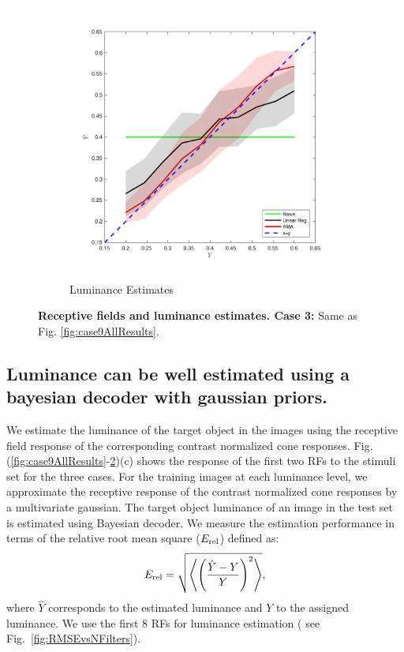 \documentclass{jov}
\begin{document}
\begin{figure}
\begin{subfigure}[b]{0.2 \textwidth}
        \includegraphics[width=\textwidth]{../Figures/Figure12/Figure12_c.pdf}
        \caption{Luminance Estimates}
        \label{fig:case12Results}
    \end{subfigure}
    \caption{{\bf Receptive fields and luminance estimates. Case 3:}  Same as Fig. \ref{fig:case9AllResults}.}
    \label{fig:case12AllResults}
\end{figure}

\subsection{Luminance can be well estimated using a bayesian decoder with gaussian priors.}
We estimate the luminance of the target object in the images using the receptive field response of the corresponding contrast normalized cone responses. Fig.~ (\ref{fig:case9AllResults}-\ref{fig:case12AllResults})(c) shows the response of the first two RFs to the stimuli set for the three cases. For the training images at each luminance level, we approximate the receptive response of the contrast normalized cone responses by a multivariate gaussian. The target object luminance of an image in the test set is estimated using Bayesian decoder. We measure the estimation performance in terms of the relative root mean square ($E_{\rm rel}$) defined as:
\begin{align}
E_{\rm rel} = \sqrt{\left\langle\left(\frac{\hat{Y}-Y}{Y}\right)^2\right\rangle},
\end{align}
where $\hat{Y}$ corresponds to the estimated luminance and $Y$ to the assigned luminance. We use the first 8 RFs for luminance estimation ( see Fig.~\ref{fig:RMSEvsNFilters}).
\end{document}
